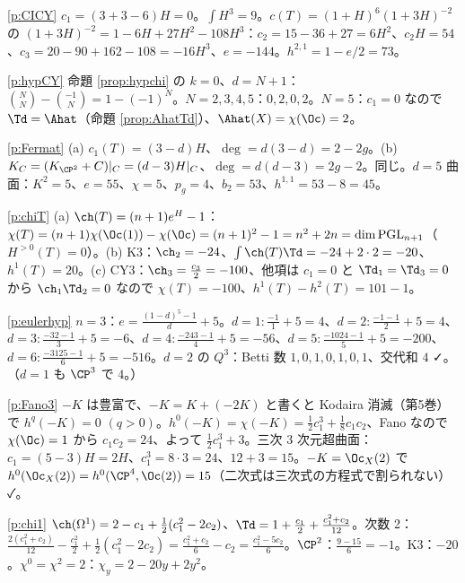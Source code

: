 \begin{sol}{\ref{p:CICY}}
$c_1=(3+3-6)H=0$。$\int H^3=9$。$c(T)=(1+H)^6(1+3H)^{-2}$ の $(1+3H)^{-2}=1-6H+27H^2-108H^3$：$c_2=15-36+27=6H^2$、$c_2H=54$、$c_3=20-90+162-108=-16H^3$、$e=-144$。$h^{2,1}=1-e/2=73$。
\end{sol}
\begin{sol}{\ref{p:hypCY}}
命題 \ref{prop:hypchi} の $k=0$、$d=N+1$：$\binom{N}N-\binom{-1}N=1-(-1)^N$。$N=2,3,4,5$：$0,2,0,2$。$N=5$：$c_1=0$ なので $\Td=\Ahat$（命題 \ref{prop:AhatTd}）、$\Ahat(X)=\chi(\Oc)=2$。
\end{sol}
\begin{sol}{\ref{p:Fermat}}
(a) $c_1(T)=(3-d)H$、$\deg=d(3-d)=2-2g$。(b) $K_C=(K_{\CP^2}+C)|_C=(d-3)H|_C$、$\deg=d(d-3)=2g-2$。同じ。$d=5$ 曲面：$K^2=5$、$e=55$、$\chi=5$、$p_g=4$、$b_2=53$、$h^{1,1}=53-8=45$。
\end{sol}
\begin{sol}{\ref{p:chiT}}
(a) $\ch(T)=(n+1)e^H-1$：$\chi(T)=(n+1)\chi(\Oc(1))-\chi(\Oc)=(n+1)^2-1=n^2+2n=\dim\mathrm{PGL}_{n+1}$（$H^{>0}(T)=0$）。(b) K3：$\ch_2=-24$、$\int\ch(T)\Td=-24+2\cdot2=-20$、$h^1(T)=20$。(c) CY3：$\ch_3=\frac{c_3}2=-100$、他項は $c_1=0$ と $\Td_1=\Td_3=0$ から $\ch_1\Td_2=0$ なので $\chi(T)=-100$、$h^1(T)-h^2(T)=101-1$。
\end{sol}
\begin{sol}{\ref{p:eulerhyp}}
$n=3$：$e=\frac{(1-d)^5-1}d+5$。$d=1:\frac{-1}1+5=4$、$d=2:\frac{-1-1}2+5=4$、$d=3:\frac{-32-1}3+5=-6$、$d=4:\frac{-243-1}4+5=-56$、$d=5:\frac{-1024-1}5+5=-200$、$d=6:\frac{-3125-1}6+5=-516$。$d=2$ の $Q^3$：Betti 数 $1,0,1,0,1,0,1$、交代和 $4$ ✓。（$d=1$ も $\CP^3$ で $4$。）
\end{sol}
\begin{sol}{\ref{p:Fano3}}
$-K$ は豊富で、$-K=K+(-2K)$ と書くと Kodaira 消滅（第5巻）で $h^q(-K)=0$ $(q>0)$。$h^0(-K)=\chi(-K)=\frac12c_1^3+\frac18c_1c_2$、Fano なので $\chi(\Oc)=1$ から $c_1c_2=24$、よって $\frac12c_1^3+3$。三次 3 次元超曲面：$c_1=(5-3)H=2H$、$c_1^3=8\cdot3=24$、$12+3=15$。$-K=\Oc_X(2)$ で $h^0(\Oc_X(2))=h^0(\CP^4,\Oc(2))=15$（二次式は三次式の方程式で割られない）✓。
\end{sol}
\begin{sol}{\ref{p:chi1}}
$\ch(\Omega^1)=2-c_1+\frac12(c_1^2-2c_2)$、$\Td=1+\frac{c_1}2+\frac{c_1^2+c_2}{12}$。次数 2：$\frac{2(c_1^2+c_2)}{12}-\frac{c_1^2}2+\frac12(c_1^2-2c_2)=\frac{c_1^2+c_2}6-c_2=\frac{c_1^2-5c_2}6$。$\CP^2$：$\frac{9-15}6=-1$。K3：$-20$。$\chi^0=\chi^2=2$：$\chi_y=2-20y+2y^2$。
\end{sol}
